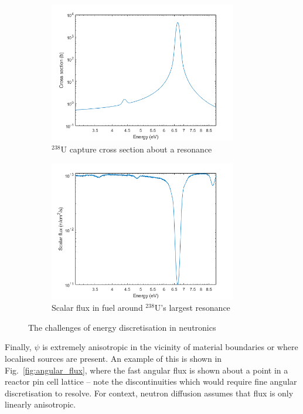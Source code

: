 \documentclass{article}
\begin{document}
\begin{figure}[h]
     \centering
     \begin{subfigure}{0.45\textwidth}
         \centering
         \includegraphics[width=0.9\textwidth]{cross_section_238.png}
         \caption{$^{238}$U capture cross section about a resonance}
     \end{subfigure}
     \begin{subfigure}{0.45\textwidth}
         \centering
         \includegraphics[width=0.9\textwidth]{scalar_flux_238.png}
         \caption{Scalar flux in fuel around $^{238}$U's largest resonance}
     \end{subfigure}
        \caption{The challenges of energy discretisation in neutronics}
        \label{fig:energy_variation}
\end{figure}

Finally, $\psi$ is extremely anisotropic in the vicinity of material boundaries or where localised sources are present. An example of this is shown in Fig.~\ref{fig:angular_flux}, where the fast angular flux is shown about a point in a reactor pin cell lattice -- note the discontinuities which would require fine angular discretisation to resolve. For context, neutron diffusion assumes that flux is only linearly anisotropic.
\end{document}

